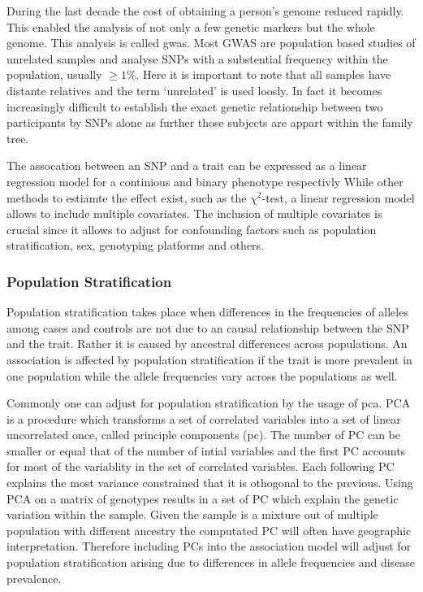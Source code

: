 During the last decade the cost of obtaining a person's genome reduced rapidly.
This enabled the analysis of not only a few genetic markers but the whole genome.
This analysis is called \acrfull{gwas}.
Most GWAS are population based studies of unrelated samples and analyse SNPs with a substential frequency within the population, usually $\ge 1\%$.
Here it is important to note that all samples have distante relatives and the term `unrelated' is used loosly.
In fact it becomes increasingly difficult to establish the exact genetic relationship between two participants by SNPs alone as further those subjects are appart within the family tree.

The assocation between an SNP and a trait can be expressed as a linear regression model for a continious and binary phenotype respectivly
While other methods to estiamte the effect exist, such as the $\chi^2$-test, a linear regression model allows to include multiple covariates.
The inclusion of multiple covariates is crucial since it allows to adjust for confounding factors such as population stratification, sex, genotyping platforms and others.

\subsubsection{Population Stratification}
\label{ssub:population_stratification}
Population stratification takes place when differences in the frequencies of alleles among cases and controls are not due to an causal relationship between the SNP and the trait.
Rather it is caused by ancestral differences across populations.
An association is affected by population stratification if the trait is more prevalent in one population while the allele frequencies vary across the populations as well.

Commonly one can adjust for population stratification by the usage of \acrfull{pca}.
PCA is a procedure which transforms a set of correlated variables into a set of linear uncorrelated once, called principle components (\acrshort{pc}).
The number of PC can be smaller or equal that of the number of intial variables and the first PC accounts for most of the variablity in the set of correlated variables.
Each following PC explains the most variance constrained that it is othogonal to the previous.
Using PCA on a matrix of genotypes results in a set of PC which explain the genetic variation within the sample.
Given the sample is a mixture out of multiple population with different ancestry the computated PC will often have geographic interpretation.
Therefore including PCs into the association model will adjust for population stratification arising due to differences in allele frequencies and disease prevalence.

